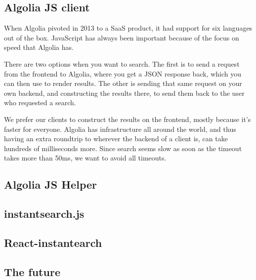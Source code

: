 \subsection{Algolia JS client} %
\label{sub:algolia_js_client}

When Algolia pivoted\cite{algolia-blog-saas} in 2013 to a SaaS product, it had support\cite{algolia-blog-lauch} for six languages out of the box. JavaScript has always been important because of the focus on speed that Algolia has.

There are two options when you want to search. The first is to send a request from the frontend to Algolia, where you get a JSON response back, which you can then use to render results. The other is sending that same request on your own backend, and constructing the results there, to send them back to the user who requested a search.

We prefer our clients to construct the results on the frontend, mostly because it's faster for everyone. Algolia has infrastructure\cite{algolia-infra} all around the world, and thus having an extra roundtrip to wherever the backend of a client is, can take hundreds of milliseconds more. Since search seems slow as soon as the timeout takes more than 50ms, we want to avoid all timeouts.


\subsection{Algolia JS Helper} %
\label{sub:algolia_js_helper}


\subsection{instantsearch.js} %
\label{sub:instantsearch_js}


\subsection{React-instantearch} %
\label{sub:react_instantearch}


\subsection{The future} %
\label{sub:the_future}


